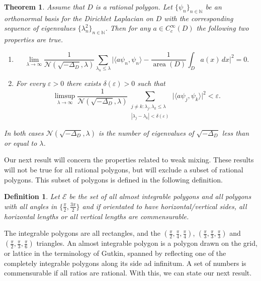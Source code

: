 \documentclass[10pt,a4paper]{amsart}
\newcommand{\N}{\mathbb{N}}
\newcommand{\1}{\mathrm{\mathbf{1}}}
\DeclareMathOperator{\area}{area}
\numberwithin{equation}{section}
\newtheorem{theorem}[thm]{Theorem}
\newtheorem{definition}[thm]{Definition}
\begin{document}
\begin{theorem}\label{thm:main_1}
    Assume that $D$ is a rational polygon. Let $\{\psi_n\}_{n\in\N}$ be an orthonormal basis for the Dirichlet Laplacian on $D$ with the corresponding sequence of eigenvalues $\{\lambda_n^2\}_{n\in\N}$. Then for any $a\in C^\infty_c(D)$ the following two properties are true.  
    \begin{enumerate}[label=$(\arabic*)$]
        \item
        \begin{equation*}
        \lim_{\lambda\rightarrow \infty}\frac{1}{\mathcal{N}(\sqrt{-\Delta_D},\lambda)} \sum_{\lambda_n \leq \lambda} \Big| \langle a \psi_n , \psi_n\rangle - \frac{1}{\area(D)} \int_{D} a(x)  \, dx \Big|^2 =0.
        \end{equation*}
        \item For every $\varepsilon>0$ there exists $\delta(\varepsilon)>0$ such that
        \begin{equation*}
        \limsup_{\lambda\rightarrow \infty}\frac{1}{\mathcal{N}(\sqrt{-\Delta_D},\lambda)} \sum_{\substack{j\neq k: \lambda_j,\lambda_k\leq \lambda  \\ |\lambda_{j}-\lambda_{k}| < \delta(\varepsilon)}} \big| \langle a \psi_j , \psi_k\rangle  \big|^2 <\varepsilon.
        \end{equation*}
    \end{enumerate}
    In both cases $\mathcal{N}(\sqrt{-\Delta_D},\lambda)$ is the number of eigenvalues of $\sqrt{-\Delta_D}$ less than or equal to $\lambda$. 
\end{theorem}


Our next result will concern the properties related to weak mixing. These results will not be true for all rational polygons, but will exclude a subset of rational polygons. This subset of polygons is defined in the following definition. 

\begin{definition}
    Let $\mathcal{E}$ be the set of all almost integrable polygons and all polygons with all angles in $\{\frac{\pi}{2},\frac{3\pi}{2}\}$ and if orientated to have horizontal/vertical sides, all horizontal lengths or all vertical lengths are commensurable.
\end{definition}

The integrable polygons are all rectangles, and the $(\frac{\pi}{2},\frac{\pi}{4},\frac{\pi}{4})$, $(\frac{\pi}{3},\frac{\pi}{3},\frac{\pi}{3})$ and $(\frac{\pi}{2},\frac{\pi}{3},\frac{\pi}{6})$ triangles. An almost integrable polygon is a polygon drawn on the grid, or lattice in the terminology of Gutkin, spanned by reflecting one of the completely integrable polygons along its side ad infinitum. A set of numbers is commensurable if all ratios are rational. With this, we can state our next result.
\end{document}
